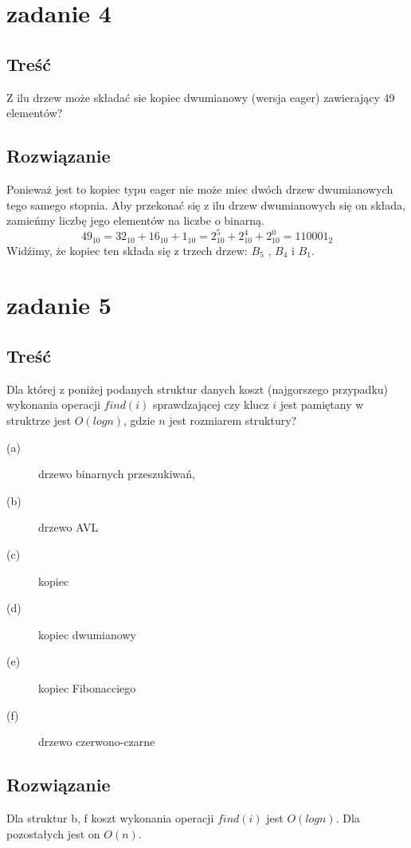\documentclass[svgnames]{report}
\begin{document}

\section{zadanie 4}
\subsection{Treść}
Z ilu drzew może składać sie kopiec dwumianowy (wersja eager) zawierający 49 elementów?
\subsection{Rozwiązanie}
Ponieważ jest to kopiec typu eager nie może miec dwóch drzew dwumianowych tego samego stopnia.
Aby przekonać się z ilu drzew dwumianowych się on składa, zamieńmy liczbę jego elementów na liczbe o binarną.
\begin{equation}
49_{10} = 32_{10} + 16_{10} + 1_{10} = 2_{10}^5 + 2_{10}^4 + 2_{10}^0 = 110001_2
\end{equation} 
Widźimy, że kopiec ten składa się z trzech drzew: $B_5$ , $B_4$ i $B_1$.


\section{zadanie 5}
\subsection{Treść}
Dla której z poniżej podanych struktur danych koszt (najgorszego przypadku) wykonania operacji $find(i)$ sprawdzającej czy klucz $i$ jest pamiętany w struktrze jest $O(log n)$, gdzie $n$ jest rozmiarem struktury?
\begin{description}
	\item[(a)] drzewo binarnych przeszukiwań,
	\item[(b)] drzewo AVL
	\item[(c)] kopiec
	\item[(d)] kopiec dwumianowy
	\item[(e)] kopiec Fibonacciego
	\item[(f)] drzewo czerwono-czarne
\end{description}
\subsection{Rozwiązanie}
Dla struktur b, f koszt wykonania operacji $find(i)$ jest $O(log n)$.
Dla pozostałych jest on $O(n)$.
\end{document}
